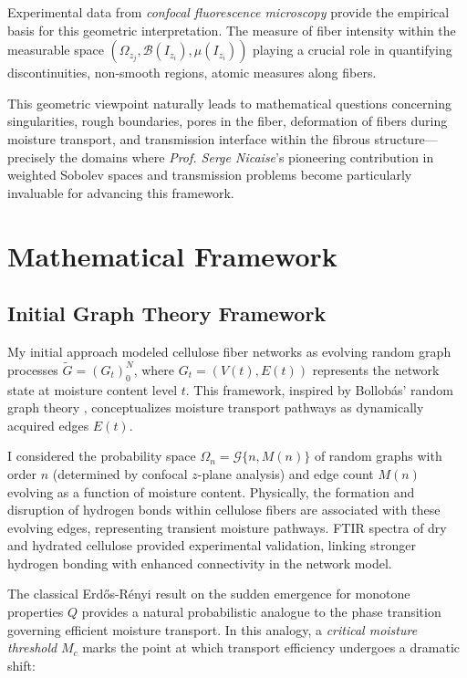 \documentclass[11pt]{article}
\begin{document}
Experimental data from \textit{confocal fluorescence microscopy} provide the empirical basis for this geometric interpretation.  The measure of fiber intensity within the measurable space $(\Omega_{z_j}, \mathcal{B}(I_{z_i}), \mu(I_{z_{i}}))$ playing a crucial role in quantifying discontinuities, non-smooth regions, atomic measures along fibers.

This geometric viewpoint naturally leads to mathematical questions concerning singularities, rough boundaries, pores in the fiber, deformation of fibers during moisture transport, and transmission interface within the fibrous structure---precisely the domains where \textit{Prof. Serge Nicaise}'s pioneering contribution in weighted Sobolev spaces and transmission problems become particularly invaluable for advancing this framework.

\section{Mathematical Framework}
\subsection{Initial Graph Theory Framework}
My initial approach modeled cellulose fiber networks as evolving random graph processes $\widetilde{G} = (G_t)_{0}^{N}$, where $G_t = (V(t), E(t))$ represents the network state at moisture content level $t$. This framework, inspired by Bollob\'as' random graph theory \cite{bollobas2011random}, conceptualizes moisture transport pathways as dynamically acquired edges $E(t)$. 

I considered the probability space $\Omega_n = \mathcal{G}\{n, M(n)\}$ of random graphs with order $n$ (determined by confocal $z$-plane analysis) and edge count $M(n)$ evolving as a function of moisture content. Physically, the formation and disruption of hydrogen bonds within 
cellulose fibers are associated with these evolving edges, representing transient moisture 
pathways. FTIR spectra of dry and hydrated cellulose provided experimental validation, 
linking stronger hydrogen bonding with enhanced connectivity in the network model.

The classical Erd\H{o}s-R\'enyi result on the sudden emergence for monotone properties $Q$ \cite{erdHos1960evolution} provides a natural probabilistic analogue to the phase transition governing efficient moisture transport. In this analogy, a \textit{critical moisture threshold} $M_c$ marks the point at which transport efficiency undergoes a dramatic shift:
\end{document}
